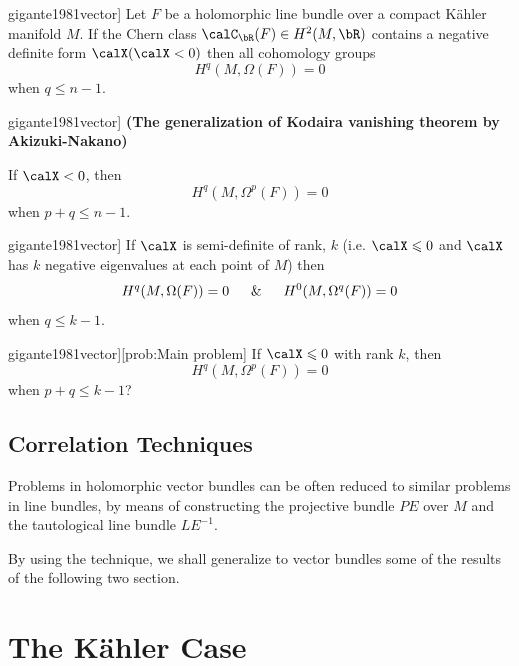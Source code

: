 \documentclass[lang=en,12pt]{beautybook}
\begin{document}
\begin{theorem}[][Another description of Kodaira vanishing theorem\cite[Introduction]{gigante1981vector}]
  Let $F$ be a holomorphic line bundle over a compact K\"ahler manifold $M$. If the Chern class $\calC_{\bR}(F)\in H^2(M,\bR)$ contains a negative definite form $\calX (\calX<0)$ then all cohomology groups $$H^q(M,\Omega(F))=0$$ when $q\leqslant n-1$.
\end{theorem}

\begin{theorem}[][Akizuki-Nakano Vanishing Theorem\cite[Introduction]{gigante1981vector}]
  \textbf{(The generalization of Kodaira vanishing theorem by Akizuki-Nakano)}

  If $\calX<0$, then
  \[H^q(M,\Omega^p(F))=0\]
  when $p+q\leqslant n-1$.
\end{theorem}

\begin{theorem}[][Vesentini vanishing theorem\cite[Introduction]{gigante1981vector}]
  If $\calX$ is semi-definite of rank, $k$ (i.e. $\calX\leqslant 0$ and $\calX$ has $k$ negative eigenvalues at each point of $M$) then
  \[H^q(M,\Omega(F))=0 \quad \And \quad H^0(M,\Omega^q(F))=0\]
  when $q\leqslant k-1$.
\end{theorem}

\begin{problem}[][\cite[Introduction]{gigante1981vector}][prob:Main problem]
If $\calX\leqslant 0$ with rank $k$, then
\[H^q(M,\Omega^p(F))=0\]
when $p+q\leqslant k-1$?
\end{problem}

\subsection{Correlation Techniques}

\begin{fancybox}
  Problems in holomorphic vector bundles can be often reduced to similar problems in line bundles, by means of constructing the projective bundle $PE$ over $M$ and the tautological line bundle $LE^{-1}$.
\end{fancybox}

By using the technique, we shall generalize to vector bundles some of the results of the following two section.

\section{The K\"ahler Case}
\newcommand{\tmcolor}[2]{{\color{#1}{#2}}}
\newcommand{\tmverbatim}[1]{\text{{\ttfamily{#1}}}}
\newcommand{\tmop}[1]{\ensuremath{\operatorname{#1}}}
\newcommand{\tmstrong}[1]{\textbf{#1}}
\providecommand{\xequal}[2][]{\mathop{=}\limits_{#1}^{#2}}
\end{document}
